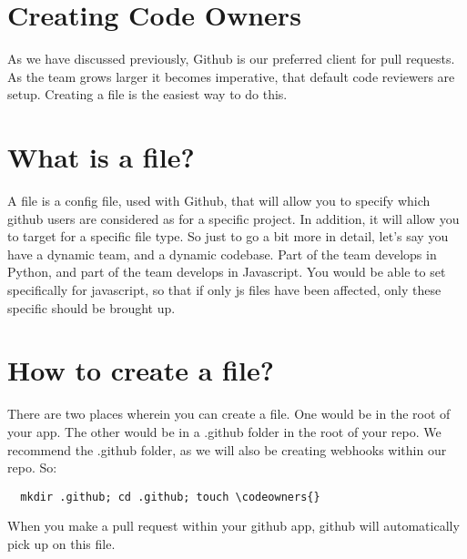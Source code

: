 \maketitle{}
\section{ Creating Code Owners }

As we have discussed previously, Github is our preferred client for pull
requests. As the team grows larger it becomes imperative, that default code
reviewers are setup. Creating a \codeowners{} file is the easiest way to do this.

\section{ What is a \codeowners{} file? }
A \codeowners{} file is a config file, used with Github, that will allow you to
specify which github users are considered as \codeowners{} for a specific project.
In addition, it will allow you to target \codeowners{} for a specific file type.
So just to go a bit more in detail, let's say you have a dynamic team, and a
dynamic codebase. Part of the team develops in Python, and part of the team
develops in Javascript. You would be able to set \codeowners{} specifically for
javascript, so that if only js files have been affected, only these specific
\codeowners{} should be brought up.

\section{ How to create a \codeowners{} file? }
There are two places wherein you can create a \codeowners{} file. One would be
in the root of your app. The other would be in a .github folder in the root of
your repo. We recommend the .github folder, as we will also be creating webhooks
within our repo. So:
\begin{verbatim}
  mkdir .github; cd .github; touch \codeowners{}
\end{verbatim}
When you make a pull request within your github app, github will automatically
pick up on this file.
